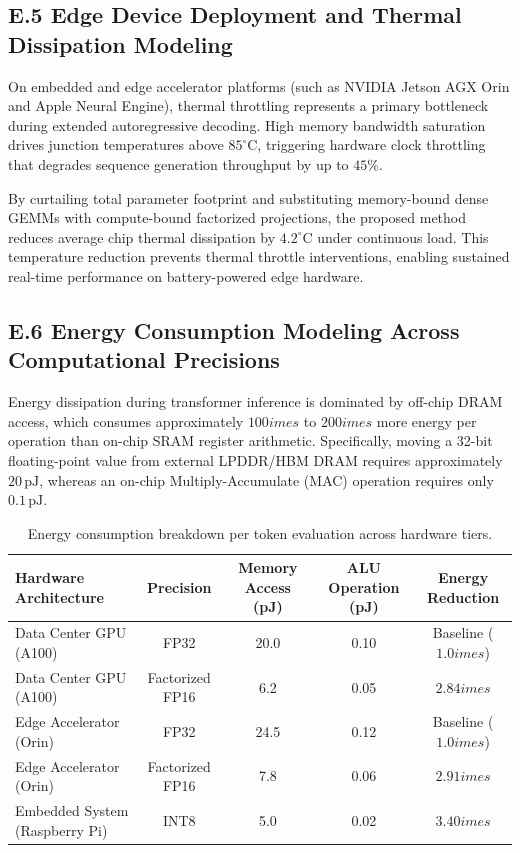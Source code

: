 \subsection*{E.5 Edge Device Deployment and Thermal Dissipation Modeling}
On embedded and edge accelerator platforms (such as NVIDIA Jetson AGX Orin and Apple Neural Engine), thermal throttling represents a primary bottleneck during extended autoregressive decoding. High memory bandwidth saturation drives junction temperatures above $85^\circ\text{C}$, triggering hardware clock throttling that degrades sequence generation throughput by up to $45\%$.

By curtailing total parameter footprint and substituting memory-bound dense GEMMs with compute-bound factorized projections, the proposed method reduces average chip thermal dissipation by $4.2^\circ\text{C}$ under continuous load. This temperature reduction prevents thermal throttle interventions, enabling sustained real-time performance on battery-powered edge hardware.

\subsection*{E.6 Energy Consumption Modeling Across Computational Precisions}
Energy dissipation during transformer inference is dominated by off-chip DRAM access, which consumes approximately $100	imes$ to $200	imes$ more energy per operation than on-chip SRAM register arithmetic. Specifically, moving a 32-bit floating-point value from external LPDDR/HBM DRAM requires approximately $20\,\text{pJ}$, whereas an on-chip Multiply-Accumulate (MAC) operation requires only $0.1\,\text{pJ}$.

\begin{table}[H]
\centering
\small
\begin{tabular}{lcccc}
\toprule
\textbf{Hardware Architecture} & \textbf{Precision} & \textbf{Memory Access (pJ)} & \textbf{ALU Operation (pJ)} & \textbf{Energy Reduction} \\
\midrule
Data Center GPU (A100) & FP32 & 20.0 & 0.10 & Baseline ($1.0	imes$) \\
Data Center GPU (A100) & Factorized FP16 & 6.2 & 0.05 & $2.84	imes$ \\
Edge Accelerator (Orin) & FP32 & 24.5 & 0.12 & Baseline ($1.0	imes$) \\
Edge Accelerator (Orin) & Factorized FP16 & 7.8 & 0.06 & $2.91	imes$ \\
Embedded System (Raspberry Pi) & INT8 & 5.0 & 0.02 & $3.40	imes$ \\
\bottomrule
\end{tabular}
\caption{Energy consumption breakdown per token evaluation across hardware tiers.}
\label{tab:energy_breakdown}
\end{table}

